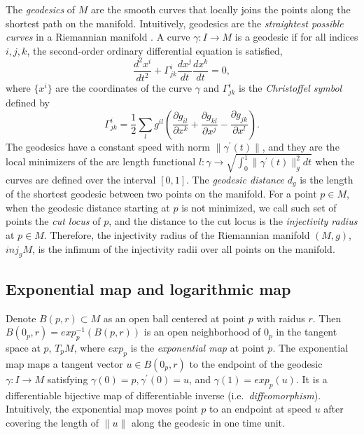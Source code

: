 \documentclass[11pt,a4paper,]{article}
\begin{document}
The \emph{geodesics} of \(M\) are the smooth curves that locally joins the points along the shortest path on the manifold. Intuitively, geodesics are the \emph{straightest possible curves} in a Riemannian manifold \autocite[Section 7.2.3 of][]{Nakahara2018-zs}.
A curve \(\gamma: I \rightarrow M\) is a geodesic if for all indices \(i,j,k\), the second-order ordinary differential equation is satisfied,
\[
\frac{d^2 x^i}{dt^2} + \Gamma^i_{jk} \frac{d x^j}{dt} \frac{dx^k}{dt} = 0,
\]
where \(\{x^i\}\) are the coordinates of the curve \(\gamma\) and \(\Gamma^i_{jk}\) is the \emph{Christoffel symbol} defined by
\[
\Gamma^i_{jk} = \frac{1}{2} \sum_l g^{il} (\frac{\partial g_{il}}{\partial x^k} 
+ \frac{\partial g_{kl}}{\partial x^j} - \frac{\partial g_{jk}}{\partial x^l}).
\]
The geodesics have a constant speed with norm \(\| \gamma^\prime(t) \|\), and they are the local minimizers of the arc
length functional \(l:\gamma \rightarrow \sqrt{\int_0^1 \| \gamma^\prime(t) \|_g^2 dt}\) when the curves are defined over the interval \([0,1]\).
The \emph{geodesic distance} \(d_g\) is the length of the shortest geodesic between two points on the manifold. For a point \(p \in M\), when the geodesic distance starting at \(p\) is not minimized, we call such set of points the \emph{cut locus} of \(p\), and the distance to the cut locus is the \emph{injectivity radius} at \(p \in M\). Therefore, the injectivity radius of the Riemannian manifold \((M,g)\), \(\textit{inj}_gM\), is the infimum of the injectivity radii over all points on the manifold.

\hypertarget{exponential-map-and-logarithmic-map}{%
\subsection{Exponential map and logarithmic map}\label{exponential-map-and-logarithmic-map}}

Denote \(B(p, r) \subset M\) as an open ball centered at point \(p\) with raidus \(r\). Then \(B(0_p, r) = exp_p^{-1}(B(p,r))\) is an open neighborhood of \(0_p\) in the tangent space at \(p\), \(T_pM\), where \(exp_p\) is the \emph{exponential map} at point \(p\). The exponential map maps a tangent vector \(u \in B(0_p, r)\) to the endpoint of the geodesic \(\gamma: I \rightarrow M\) satisfying \(\gamma(0)=p, \gamma^{\prime}(0)=u\), and \(\gamma(1)=exp_p(u)\). It is a differentiable bijective map of differentiable inverse (i.e.~\emph{diffeomorphism}). Intuitively, the exponential map moves point \(p\) to an endpoint at speed \(u\) after covering the length of \(\|u\|\) along the geodesic in one time unit.
\end{document}
